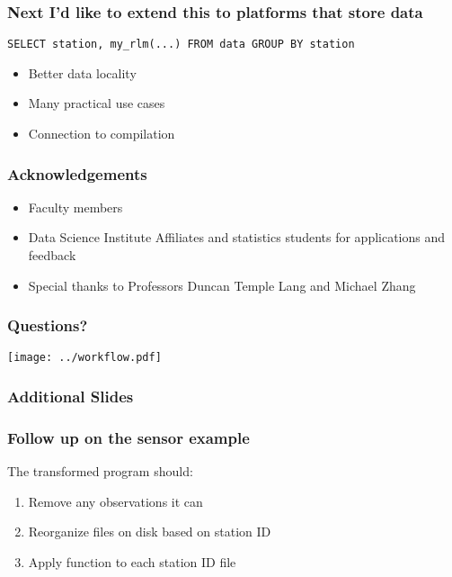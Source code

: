 \documentclass{beamer}
\begin{document}
\begin{frame}[fragile]

\frametitle{Next I'd like to extend this to platforms that store data}

\begin{verbatim}
SELECT station, my_rlm(...) FROM data GROUP BY station
\end{verbatim}

\begin{itemize}
    \item Better data locality
    \item Many practical use cases
    \item Connection to compilation
\end{itemize}

\end{frame}
\begin{frame}

    \frametitle{Acknowledgements}

\begin{itemize}
    \item Faculty members
    \item Data Science Institute Affiliates and statistics students for
        applications and feedback
    \item Special thanks to Professors Duncan Temple Lang and Michael Zhang
\end{itemize}

\end{frame}
\begin{frame}

    \frametitle{Questions?}
    \centerline{\texttt{[image: ../workflow.pdf]}}

\end{frame}
\begin{frame}

    \frametitle{Additional Slides}

\end{frame}
\begin{frame}

    \frametitle{Follow up on the sensor example}

    The transformed program should:

\begin{enumerate}
    \item Remove any observations it can
    \item Reorganize files on disk based on station ID
    \item Apply function to each station ID file
\end{enumerate}

\end{frame}
\end{document}
